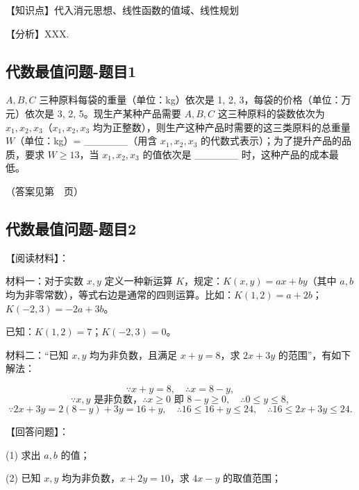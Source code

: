 \begin{proposition}[多知识点融合] \label{pro:max}
【知识点】代入消元思想、线性函数的值域、线性规划

【分析】XXX.
\end{proposition}

\subsection{代数最值问题-题目1}

\(A, B, C\) 三种原料每袋的重量（单位：kg）依次是 1, 2, 3，每袋的价格（单位：万元）依次是 3, 2, 5。现生产某种产品需要 \(A, B, C\) 这三种原料的袋数依次为 \(x_1, x_2, x_3\)（\(x_1, x_2, x_3\) 均为正整数），则生产这种产品时需要的这三类原料的总重量 \(W\)（单位：kg）= \_\_\_\_\_\_（用含 \(x_1, x_2, x_3\) 的代数式表示）；为了提升产品的品质，要求 \(W \geq 13\)，当 \(x_1, x_2, x_3\) 的值依次是 \_\_\_\_\_\_ 时，这种产品的成本最低。

（答案见第~\pageref{代数最值问题-题目1}~页）

\vspace{8cm}


\subsection{代数最值问题-题目2}



【阅读材料】：

材料一：对于实数 \(x, y\) 定义一种新运算 \(K\)，规定：\(K(x, y) = ax + by\)（其中 \(a, b\) 均为非零常数），等式右边是通常的四则运算。比如：\(K(1, 2) = a + 2b\)；\(K(-2, 3) = -2a + 3b\)。

已知：\(K(1, 2) = 7\)；\(K(-2, 3) = 0\)。

材料二：“已知 \(x, y\) 均为非负数，且满足 \(x + y = 8\)，求 \(2x + 3y\) 的范围”，有如下解法：

\[\because x + y = 8, \quad \therefore x = 8 - y,\]
\[\because x, y \text{ 是非负数，} \therefore x \geq 0 \text{ 即 } 8 - y \geq 0, \quad \therefore 0 \leq y \leq 8,\]
\[\because 2x + 3y = 2(8 - y) + 3y = 16 + y, \quad \therefore 16 \leq 16 + y \leq 24, \quad \therefore 16 \leq 2x + 3y \leq 24.\]

【回答问题】：

(1) 求出 \(a, b\) 的值；

\vspace{3cm}

(2) 已知 \(x, y\) 均为非负数，\(x + 2y = 10\)，求 \(4x - y\) 的取值范围；


